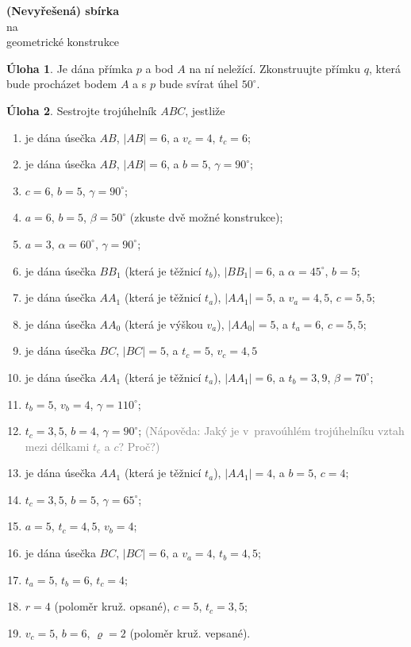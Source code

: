 \documentclass[9pt,a5paper]{extarticle}
\theoremstyle{definition}
\newtheorem{uloha}{Úloha}
\def\tisk{%
\newbox\shipouthackbox
\pdfpagewidth=2\pdfpagewidth
\let\oldshipout=\shipout
\def\shipout{\afterassignment\zdvojtmp \setbox\shipouthackbox=}%
\def\zdvojtmp{\aftergroup\zdvoj}%
\def\zdvoj{%
    \oldshipout\vbox{\hbox{%
        \copy\shipouthackbox
        \hskip\dimexpr .5\pdfpagewidth-\wd\shipouthackbox\relax
        \box\shipouthackbox
    }}%
}}%
\newcommand{\staritem}{\item[\addtocounter{enumi}{1}$\star$ (\alph{enumi})]}
\newcommand{\hint}[1]{{\footnotesize\textcolor{gray}{(Nápověda: #1)}}}
\begin{document}

\begin{center}
    \textbf{\LARGE (Nevyřešená) sbírka}\\[1mm]
    na\\[1mm]
    {\Large geometrické konstrukce}
\end{center}



\begin{uloha}
Je dána přímka $p$ a bod $A$ na ní neležící. Zkonstruujte přímku $q$, která bude procházet bodem $A$ a s $p$ bude svírat úhel $50^\circ$.
\end{uloha}

\begin{uloha}
Sestrojte trojúhelník $ABC$, jestliže\par
\begin{multicols}{2}%
\begin{enumerate}[topsep=0pt]
    \item je dána úsečka $AB$, $|AB|=6$, a $v_c=4$, $t_c=6$; %
    \item je dána úsečka $AB$, $|AB|=6$, a $b=5$, $\gamma=90^\circ$; %
    \item $c = 6$, $b = 5$, $\gamma=90^\circ$; %
    \item $a = 6$, $b = 5$, $\beta=50^\circ$ (zkuste dvě možné konstrukce); %
    \item $a=3$, $\alpha=60^\circ$, $\gamma=90^\circ$; %
    \item je dána úsečka $BB_1$ (která je těžnicí $t_b$), $|BB_1| = 6$, a $\alpha=45^\circ$, $b=5$; %
    \item je dána úsečka $AA_1$ (která je těžnicí $t_a$), $|AA_1| = 5$, a $v_a=4{,}5$, $c=5{,}5$; %
    \item je dána úsečka $AA_0$ (která je výškou $v_a$), $|AA_0| = 5$, a $t_a=6$, $c=5{,}5$; %
    \item je dána úsečka $BC$, $|BC|=5$, a $t_c=5$, $v_c=4{,}5$ %
    \staritem je dána úsečka $AA_1$ (která je těžnicí $t_a$), $|AA_1| = 6$, a $t_b=3{,}9$, $\beta=70^\circ$; %
    \item $t_b=5$, $v_b=4$, $\gamma=110^\circ$; %
    \item $t_c=3{,}5$, $b=4$, $\gamma=90^\circ$; \hint{Jaký je v~pravoúhlém trojúhelníku vztah mezi délkami $t_c$ a $c$? Proč?} %
    \item je dána úsečka $AA_1$ (která je těžnicí $t_a$), $|AA_1| = 4$, a $b=5$, $c=4$; %
    \item $t_c=3{,}5$, $b=5$, $\gamma=65^\circ$; %
    \item $a=5$, $t_c=4{,}5$, $v_b=4$; %
    \item je dána úsečka $BC$, $|BC|=6$, a $v_a=4$, $t_b=4{,}5$; %
    \item $t_a=5$, $t_b=6$, $t_c=4$; %
    \item $r=4$ (poloměr kruž. opsané), $c=5$, $t_c=3{,}5$; %
    \staritem $v_c=5$, $b=6$, $\varrho=2$ (poloměr kruž. vepsané). %
\end{enumerate}
\end{multicols}
\end{uloha}
\end{document}
